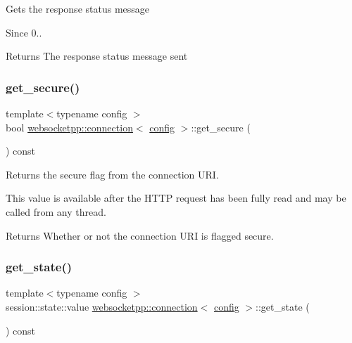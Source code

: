Gets the response status message

\begin{DoxySince}{Since}
0..
\end{DoxySince}
\begin{DoxyReturn}{Returns}
The response status message sent 
\end{DoxyReturn}
\mbox{\label{classwebsocketpp_1_1connection_a38d87e9ef3c4514fcd72457a04c31260}} 
\subsubsection{\texorpdfstring{get\+\_\+secure()}{get\_secure()}}
{\footnotesize\ttfamily template$<$typename config $>$ \\
bool \mbox{\hyperlink{classwebsocketpp_1_1connection}{websocketpp\+::connection}}$<$ \mbox{\hyperlink{classconfig}{config}} $>$\+::get\+\_\+secure (\begin{DoxyParamCaption}{ }\end{DoxyParamCaption}) const}



Returns the secure flag from the connection U\+RI. 

This value is available after the H\+T\+TP request has been fully read and may be called from any thread.

\begin{DoxyReturn}{Returns}
Whether or not the connection U\+RI is flagged secure. 
\end{DoxyReturn}
\mbox{\label{classwebsocketpp_1_1connection_a9001efbd5b467ccf3e5e601bb18e4971}} 
\subsubsection{\texorpdfstring{get\+\_\+state()}{get\_state()}}
{\footnotesize\ttfamily template$<$typename config $>$ \\
session\+::state\+::value \mbox{\hyperlink{classwebsocketpp_1_1connection}{websocketpp\+::connection}}$<$ \mbox{\hyperlink{classconfig}{config}} $>$\+::get\+\_\+state (\begin{DoxyParamCaption}{ }\end{DoxyParamCaption}) const}



